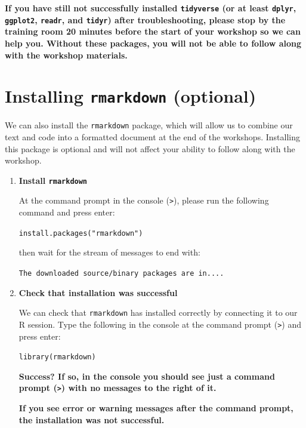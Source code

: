 \documentclass[
]{book}
\begin{document}
\begin{alert}

\textbf{If you have still not successfully installed \texttt{tidyverse} (or at least \texttt{dplyr}, \texttt{ggplot2}, \texttt{readr}, and \texttt{tidyr}) after troubleshooting, please stop by the training room 20 minutes before the start of your workshop so we can help you. Without these packages, you will not be able to follow along with the workshop materials.}

\end{alert}

\hypertarget{installing-rmarkdown-optional}{%
\section{\texorpdfstring{Installing \texttt{rmarkdown} (optional)}{Installing rmarkdown (optional)}}\label{installing-rmarkdown-optional}}

We can also install the \texttt{rmarkdown} package, which will allow us to
combine our text and code into a formatted document at the end of
the workshops. Installing this package is optional and will not affect
your ability to follow along with the workshop.

\begin{enumerate}
\def\labelenumi{\arabic{enumi}.}
\item
  \textbf{Install \texttt{rmarkdown}}

  At the command prompt in the console (\texttt{\textgreater{}}), please run the following command and press enter:

  \texttt{install.packages("rmarkdown")}

  then wait for the stream of messages to end with:

  \texttt{The\ downloaded\ source/binary\ packages\ are\ in....}
\item
  \textbf{Check that installation was successful}

  We can check that \texttt{rmarkdown} has installed correctly by connecting it to our R session.
  Type the following in the console at the command prompt (\texttt{\textgreater{}}) and press enter:

  \texttt{library(rmarkdown)}

  \begin{alert}

  \textbf{Success? If so, in the console you should see just a command prompt (\texttt{\textgreater{}}) with no messages to the right of it.}

  \end{alert}

  \begin{alert}

  \textbf{If you see error or warning messages after the command prompt, the installation was not successful.}

  \end{alert}
\end{enumerate}
\end{document}
